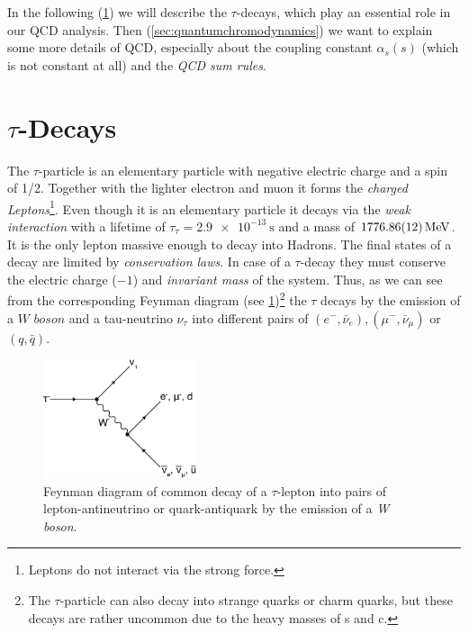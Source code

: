\documentclass[../../index.tex]{subfiles}
\begin{document}
In the following (\cref{sec:tauDecays}) we will describe the $\tau$-decays, which
play an essential role in our QCD analysis. Then (\cref{sec:quantumchromodynamics}) we want to explain some more
details of QCD, especially about the coupling constant $\alpha_s(s)$ (which is not
constant at all) and the \textit{QCD sum rules}.


\section{$\tau$-Decays}
\label{sec:tauDecays}
The $\tau$-particle is an elementary particle with negative electric charge and a
spin of 1/2. Together with the lighter electron and muon it forms the
\textit{charged Leptons}\footnote{Leptons do not interact via the strong force.}.
Even though it is an elementary particle it decays via the \textit{weak
  interaction} with a lifetime of $\tau_\tau=\SI{2.9e-13}{\second}$ and a mass
of $\SI{1776.86\pm0.12}{\mega\electronvolt}$\cite{PDG2018}. It is the only
lepton massive enough to decay into Hadrons.
The final states of a decay are limited by \textit{conservation laws}. In case
of a $\tau$-decay they must conserve the electric charge ($-1$) and
\textit{invariant mass} of the system. Thus, as we can see from
the corresponding Feynman diagram
(see \cref{fig:tauDecay})\footnote{The $\tau$-particle can also decay into strange
  quarks or charm quarks, but these decays are rather uncommon due to the heavy
  masses of s and c.} the $\tau$ decays by the emission of a $\textit{W boson}$
and a tau-neutrino $\nu_\tau$ into different pairs of $(e^-, \bar\nu_e), (\mu^-,
\bar\nu_\mu)$ or $(q, \bar q)$.
\begin{figure}[h]
  \label{fig:tauDecay}
  \centering
  \includegraphics[width=0.4\textwidth]{images/tauDecay.eps}
  \caption{Feynman diagram of common decay of a $\tau$-lepton into pairs of
    lepton-antineutrino or quark-antiquark by the emission of a \textit{W boson}.}
\end{figure}
\end{document}
